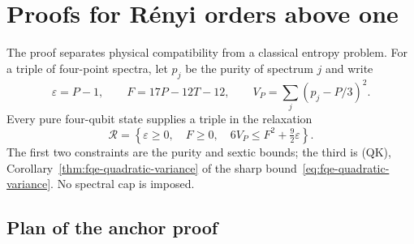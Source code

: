 \section{Proofs for R\'enyi orders above one}\label{sec:fqe-renyi-proofs}

The proof separates physical compatibility from a classical entropy problem.
For a triple of four-point spectra, let $p_j$ be the purity of spectrum $j$ and write
\[
 \varepsilon=P-1,\qquad F=17P-12T-12,\qquad
 V_P=\sum_j(p_j-P/3)^2.
\]
Every pure four-qubit state supplies a triple in the relaxation
\[
 \mathcal R=\left\{\varepsilon\ge0,\quad F\ge0,\quad
                  6V_P\le F^2+\tfrac92\varepsilon\right\}.
\]
The first two constraints are the purity and sextic bounds; the third is (QK), Corollary~\ref{thm:fqe-quadratic-variance} of the sharp bound~\eqref{eq:fqe-quadratic-variance}. No spectral cap is imposed.



\subsection{Plan of the anchor proof}\label{sec:fqe-renyi-anchor-plan}
